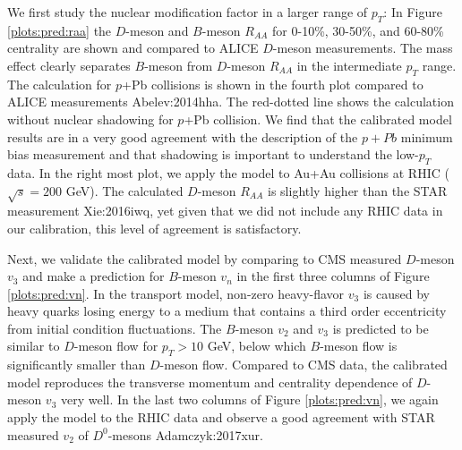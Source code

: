 We first study the nuclear modification factor in a larger range of $p_T$:
In Figure \ref{plots:pred:raa} the $D$-meson and $B$-meson $R_{AA}$ for 0-10\%, 30-50\%, and 60-80\% centrality are shown and compared to ALICE $D$-meson measurements.
The mass effect clearly separates $B$-meson from $D$-meson $R_{AA}$ in the intermediate $p_T$ range. 
The calculation for $p$+Pb collisions is shown in the fourth plot compared to ALICE measurements {Abelev:2014hha}.
The red-dotted line shows the calculation without nuclear shadowing for $p$+Pb collision.
We find that the calibrated model results are in a very good agreement with the description of the $p+Pb$ minimum bias measurement and that shadowing  is important to understand the low-$p_T$ data.
In the right most plot, we apply the model to Au+Au collisions at RHIC  ($\sqrt{s} = 200$ GeV).
The calculated $D$-meson $R_{AA}$ is slightly higher than the STAR measurement {Xie:2016iwq}, 
yet given that we did not include any RHIC data in our calibration, this level of agreement is satisfactory.

Next, we validate the calibrated model by comparing to CMS measured $D$-meson $v_3$ and make a prediction for $B$-meson $v_n$ in the first three columns of Figure \ref{plots:pred:vn}.
In the transport model, non-zero heavy-flavor $v_3$ is caused by heavy quarks losing energy to a medium that contains a third order eccentricity from initial condition fluctuations.
The $B$-meson $v_2$ and $v_3$ is predicted to be similar to $D$-meson flow for $p_T > 10$ GeV, below which $B$-meson flow is significantly smaller than $D$-meson flow.
Compared to CMS data, the calibrated model reproduces the transverse momentum and centrality dependence of $D$-meson $v_3$ very well.
In the last two columns of Figure \ref{plots:pred:vn}, we again apply the model to the RHIC data and observe a good agreement with STAR measured $v_2$ of $D^0$-mesons {Adamczyk:2017xur}.

